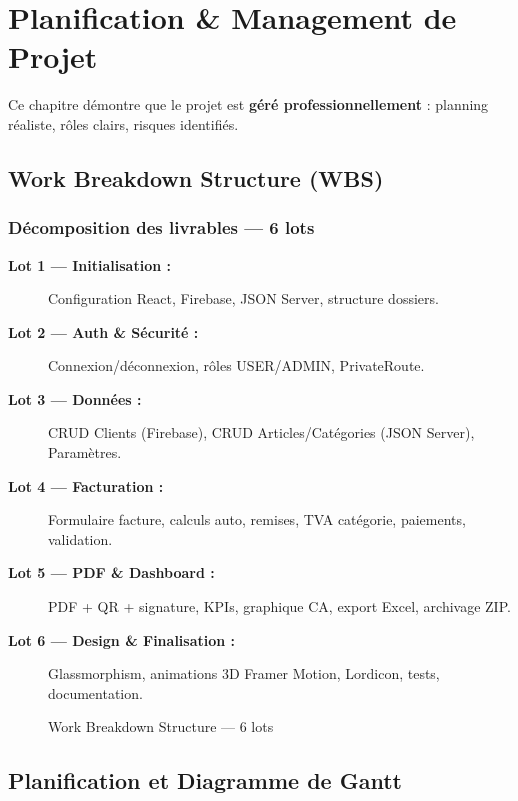 
\chapter{Planification \& Management de Projet}

Ce chapitre démontre que le projet est \textbf{géré professionnellement} : planning réaliste, rôles clairs, risques identifiés.

\section{Work Breakdown Structure (WBS)}

\subsection{Décomposition des livrables — 6 lots}

\begin{description}
    \item[\textbf{Lot 1 — Initialisation :}] Configuration React, Firebase, JSON Server, structure dossiers.
    \item[\textbf{Lot 2 — Auth \& Sécurité :}] Connexion/déconnexion, rôles USER/ADMIN, PrivateRoute.
    \item[\textbf{Lot 3 — Données :}] CRUD Clients (Firebase), CRUD Articles/Catégories (JSON Server), Paramètres.
    \item[\textbf{Lot 4 — Facturation :}] Formulaire facture, calculs auto, remises, TVA catégorie, paiements, validation.
    \item[\textbf{Lot 5 — PDF \& Dashboard :}] PDF + QR + signature, KPIs, graphique CA, export Excel, archivage ZIP.
    \item[\textbf{Lot 6 — Design \& Finalisation :}] Glassmorphism, animations 3D Framer Motion, Lordicon, tests, documentation.
\end{description}

\begin{figure}[H]
\centering
{}
\caption{Work Breakdown Structure — 6 lots}
\label{fig:wbs}
\end{figure}

\section{Planification et Diagramme de Gantt}

